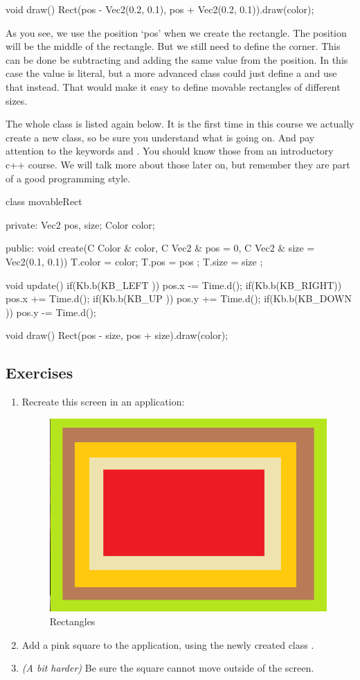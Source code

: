 \begin{code}
void draw() {
  Rect(pos - Vec2(0.2, 0.1), pos + Vec2(0.2, 0.1)).draw(color);
}
\end{code}

As you see, we use the position `pos' when we create the rectangle. The position will be the middle of the rectangle. But we still need to define the corner. This can be done be subtracting and adding the same value from the position. In this case the value is literal, but a more advanced class could just define a  and use that instead. That would make it easy to define movable rectangles of different sizes.

The whole class is listed again below. It is the first time in this course we actually create a new class, so be sure you understand what is going on. And pay attention to the keywords  and . You should know those from an introductory c++ course. We will talk more about those later on, but remember they are part of a good programming style.

\begin{code}
class movableRect {
private:
  Vec2 pos, size;
	Color color;
	
public:
  void create(C Color & color, C Vec2 & pos = 0, C Vec2 & size = Vec2(0.1, 0.1)) {
	  T.color = color;
		T.pos   = pos  ;
		T.size  = size ;
	}
	
	void update() {
		if(Kb.b(KB_LEFT )) pos.x -= Time.d();
		if(Kb.b(KB_RIGHT)) pos.x += Time.d();
		if(Kb.b(KB_UP   )) pos.y += Time.d();
		if(Kb.b(KB_DOWN )) pos.y -= Time.d();
	}
	
	void draw() {
		Rect(pos - size, pos + size).draw(color);
	}
}
\end{code}
	
\subsection{Exercises}

\begin{enumerate}
\item Recreate this screen in an application:

\begin{figure}[h]
\centering
\includegraphics[width=0.4\linewidth]{../images/nested_rectangles}
\caption[]{Rectangles}
\label{fig:nested_rect}
\end{figure}

\item Add a pink square to the application, using the newly created class .
\item \textit{(A bit harder)} Be sure the square cannot move outside of the screen.
\end{enumerate}


